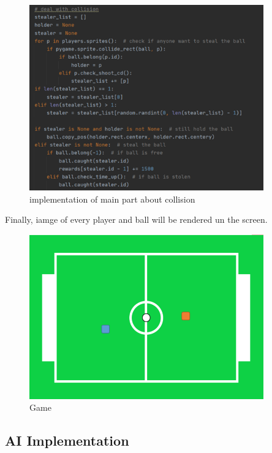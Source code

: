 \documentclass[14pt]{extarticle}
\begin{document}
	\begin{figure}[H]
	\begin{center}
		\includegraphics[width=0.9\textwidth]{collision}
		\caption{implementation of main part about collision}
	\end{center}
	\end{figure}
	Finally, iamge of every player and ball will be rendered un the screen.
	\begin{figure}[H]
		\begin{center}
			\includegraphics[width=0.9\textwidth]{game}
			\caption{Game}
		\end{center}
	\end{figure}

\subsection{AI Implementation}
\end{document}
